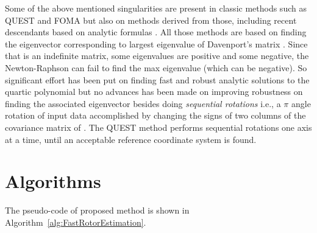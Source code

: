 \documentclass{birkjour}
\numberwithin{equation}{section}
\begin{document}
Some of the above mentioned singularities are present in classic methods such as QUEST \cite{Shuster1981} and FOMA \cite{Markley1993} but also on methods derived from those, including recent descendants based on analytic formulas \cite{Yang2013, Wu2016, Wu2017, Wu2018FA3R, Wu2018FS3R}. All those methods are based on finding the eigenvector corresponding to largest eigenvalue of Davenport's matrix \cite{Davenport1968}. Since that is an indefinite matrix, some eigenvalues are positive and some negative, the Newton-Raphson can fail to find the max eigenvalue (which can be negative). So significant effort has been put on finding fast and robust analytic solutions to the quartic polynomial but no advances has been made on improving robustness on finding the associated eigenvector besides doing \emph{sequential rotations} i.e., a $\pi$ angle rotation of input data accomplished by changing the signs of two columns of the covariance matrix of \cite{Shuster1981}. The QUEST method performs sequential rotations one axis at a time, until an acceptable reference coordinate system is found.

\section{Algorithms}
\label{section:algoritms}

The pseudo-code of proposed method is shown in Algorithm~\ref{alg:FastRotorEstimation}. 
\end{document}
